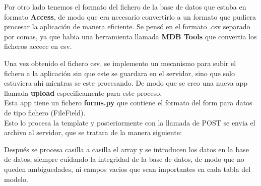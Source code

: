 Por otro lado tenemos el formato del fichero de la base de datos que estaba en formato \textbf{Access}, de modo que era necesario convertirlo a un formato que pudiera procesar la aplicación de manera eficiente. Se pensó 
en el formato .csv separado por comas, ya que habia una herramienta llamada \textbf{MDB Tools} que convertia los ficheros accecc en csv.

Una vez obtenido el fichero csv, se implemento un mecanismo para subir el fichero a la aplicación sin que este se guardara en el servidor, sino que solo estuviera ahí mientras se este procesando. De modo que se creo 
una nueva app llamada \textbf{upload} especificamente para este proceso.\\

Esta app tiene un fichero \textbf{forms.py} que contiene el formato del form para datos de tipo fichero (FileField).\\


\bigskip
Esto lo procesa la template y posteriormente con la llamada de POST se envia el archivo al servidor, que se tratara de la manera siguiente:
\bigskip


Después se procesa casilla a casilla el array y se introducen los datos en la base de datos, siempre cuidando la integridad de la base de datos, de modo que no queden ambiguedades, ni campos vacios que sean importantes 
en cada tabla del modelo.








